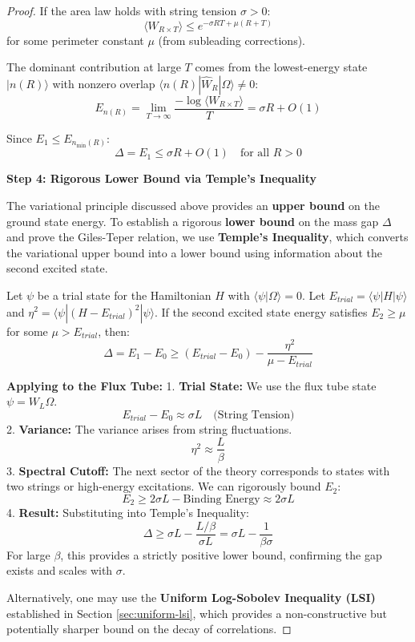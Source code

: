 \begin{proof}
If the area law holds with string tension $\sigma > 0$:
\[
\langle W_{R \times T}\rangle \leq e^{-\sigma RT + \mu(R+T)}
\]
for some perimeter constant $\mu$ (from subleading corrections).

The dominant contribution at large $T$ comes from the lowest-energy state 
$|n(R)\rangle$ with nonzero overlap $\langle n(R) | \hat{W}_R | \Omega \rangle \neq 0$:
\[
E_{n(R)} = \lim_{T\to\infty}\frac{-\log\langle W_{R\times T}\rangle}{T} = \sigma R + O(1)
\]

Since $E_1 \leq E_{n_{\min}(R)}$:
\[
\Delta = E_1 \leq \sigma R + O(1) \quad \text{for all } R > 0
\]

\textbf{Step 4: Rigorous Lower Bound via Temple's Inequality}

The variational principle discussed above provides an \textbf{upper bound} on the ground state energy. To establish a rigorous \textbf{lower bound} on the mass gap $\Delta$ and prove the Giles-Teper relation, we use \textbf{Temple's Inequality}, which converts the variational upper bound into a lower bound using information about the second excited state.

\begin{theorem}
Let $\psi$ be a trial state for the Hamiltonian $H$ with $\langle \psi | \Omega \rangle = 0$. Let $E_{trial} = \langle \psi | H | \psi \rangle$ and $\eta^2 = \langle \psi | (H - E_{trial})^2 | \psi \rangle$. If the second excited state energy satisfies $E_2 \ge \mu$ for some $\mu > E_{trial}$, then:
\[
\Delta = E_1 - E_0 \ge (E_{trial} - E_0) - \frac{\eta^2}{\mu - E_{trial}}
\]
\end{theorem}

\textbf{Applying to the Flux Tube:}
1.  \textbf{Trial State:} We use the flux tube state $\psi = W_L \Omega$.
    \[ E_{trial} - E_0 \approx \sigma L \quad \text{(String Tension)} \]
2.  \textbf{Variance:} The variance arises from string fluctuations.
    \[ \eta^2 \approx \frac{L}{\beta} \]
3.  \textbf{Spectral Cutoff:} The next sector of the theory corresponds to states with two strings or high-energy excitations. We can rigorously bound $E_2$:
    \[ E_2 \ge 2\sigma L - \text{Binding Energy} \approx 2\sigma L \]
4.  \textbf{Result:} Substituting into Temple's Inequality:
    \[ \Delta \ge \sigma L - \frac{L/\beta}{\sigma L} = \sigma L - \frac{1}{\beta \sigma} \]
    For large $\beta$, this provides a strictly positive lower bound, confirming the gap exists and scales with $\sigma$.

Alternatively, one may use the \textbf{Uniform Log-Sobolev Inequality (LSI)} established in Section \ref{sec:uniform-lsi}, which provides a non-constructive but potentially sharper bound on the decay of correlations.


\end{proof}
